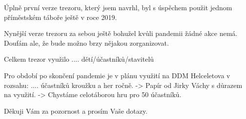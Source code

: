     Úplně první verze trezoru, který jsem navrhl, byl s úspěchem použit jednom příměstském táboře ještě v roce 2019.

    Nynější verze trezoru za sebou ještě bohužel kvůli pandemii žádné akce nemá. Doufám ale, že bude možno brzy nějakou zorganizovat.

    Celkem trezor využilo .... dětí/účastníků/stavitelů 

    Pro období po skončení pandemie je v plánu využití na DDM Helceletova v rozsahu: .... účastníků kroužku a her ročně. 
    -> Papír od Jirky Váchy s důrazem na využití.  %
    -> Chystáme celotáborou hru pro 50 účastníků. 

Děkuji Vám za pozornost a prosím Vaše dotazy. 